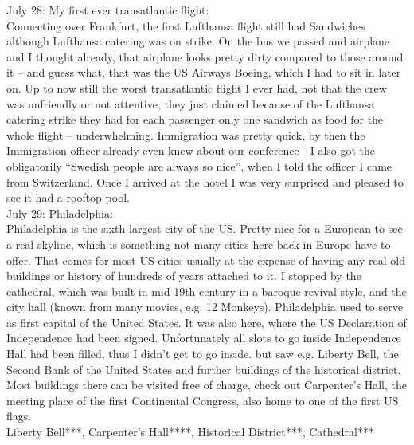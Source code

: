 July 28: My first ever transatlantic flight:\\
Connecting over Frankfurt, the first Lufthansa flight still had Sandwiches although Lufthansa catering was on strike. On the bus we passed and airplane and I thought already, that airplane looks pretty dirty compared to those around it -- and guess what, that was the US Airways Boeing, which I had to sit in later on. Up to now still the worst transatlantic flight I ever had, not that the crew was unfriendly or not attentive, they just claimed because of the Lufthansa catering strike they had for each passenger only one sandwich as food for the whole flight -- underwhelming. Immigration was pretty quick, by then the Immigration officer already even knew about our conference - I also got the obligatorily ``Swedish people are always so nice'', when I told the officer I came from Switzerland. Once I arrived at the hotel I was very surprised and pleased to see it had a rooftop pool.\\

July 29: Philadelphia:\\
Philadelphia is the sixth largest city of the US. Pretty nice for a European to see a real skyline, which is something not many cities here back in Europe have to offer. That comes for most US cities usually at the expense of having any real old buildings or history of hundreds of years attached to it. I stopped by the cathedral, which was built in mid 19th century in a baroque revival style, and the city hall (known from many movies, e.g. 12 Monkeys). Philadelphia used to serve as first capital of the United States. It was also here, where the US Declaration of Independence had been signed. Unfortunately all slots to go inside Independence Hall had been filled, thus I didn't get to go inside. but saw e.g. Liberty Bell, the Second Bank of the United States and further buildings of the historical district. Most buildings there can be visited free of charge, check out Carpenter's Hall, the meeting place of the first Continental Congress, also home to one of the first US flags.\\

Liberty Bell***, Carpenter's Hall****, Historical District***, Cathedral***\\

